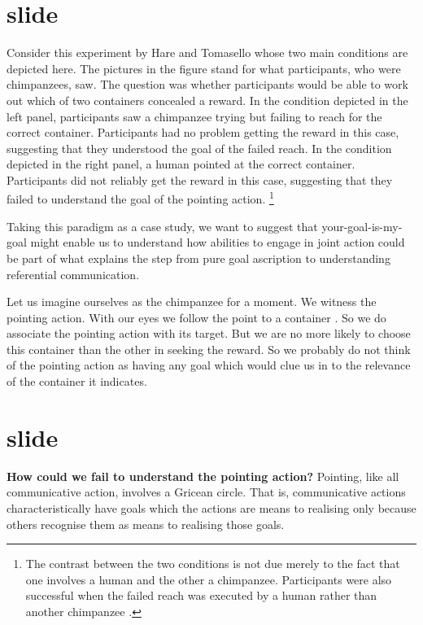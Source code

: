 \documentclass[12pt,\papersize]{extarticle}
\begin{document}
\section{slide}
Consider this experiment by Hare and Tomasello 
\citet[][experiment 3]{hare_chimpanzees_2004}
 whose two main conditions are depicted here.
The pictures in the figure stand for what participants, who were chimpanzees, saw.
The question was whether participants would be able to work out which of two containers concealed a reward.
In the condition depicted in the left panel, participants saw a chimpanzee trying but failing to reach for the correct container. 
Participants had no problem getting the reward in this case, suggesting that they understood the goal of the failed reach.
In the condition depicted in the right panel, a human pointed at the correct container.
Participants did not reliably  get the reward in this case, suggesting that they failed to understand the goal of the pointing action.%
\footnote{
The contrast between the two conditions is not due merely to the fact that one involves a human and the other a chimpanzee.
Participants were also successful when the failed reach was executed by a human rather than another chimpanzee \citep[][experiment 1]{hare_chimpanzees_2004}. 
}



Taking this paradigm as a case study, 
we want to suggest that your-goal-is-my-goal might 
enable us to understand how abilities to engage in joint action 
could be part of what explains the step from pure goal ascription to  
 understanding referential communication.
 
 Let us imagine ourselves as the chimpanzee  for a moment.
We witness the pointing action.
With our eyes we follow the point to a container \citep[see][p.\ 6]{Moll:2007gu}.
So we do associate the pointing action with its target.
But we are no more likely to choose this container than the other in seeking the reward.
So we probably do not think of the pointing action as having any goal which would clue us in to the relevance of the container it indicates.

\section{slide}
\textbf{How could we fail to understand the pointing action?}
Pointing, like all 
communicative action,
involves a Gricean circle.
That is,
communicative actions  characteristically have  goals which the actions are means to realising only because others recognise them as means to realising those goals. 
\end{document}

